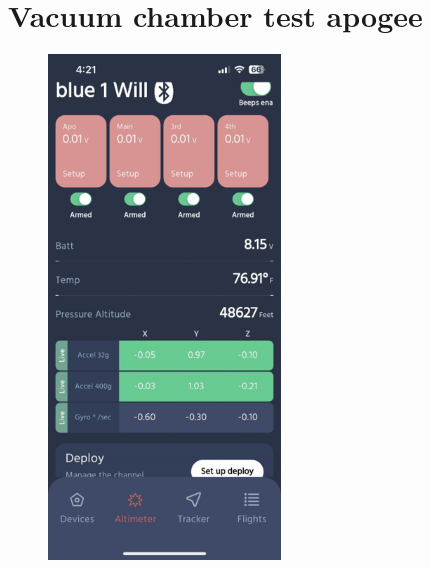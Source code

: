 \chapter{Vacuum chamber test apogee}\label{apdx:vacuum_peak-raven}
\vfill{}
\begin{figure}[h]
  \begin{center}
    \includegraphics[width=0.55\textwidth]{./img/vacuum_peak-raven.png}
  \end{center}
\end{figure}
\vfill{}

